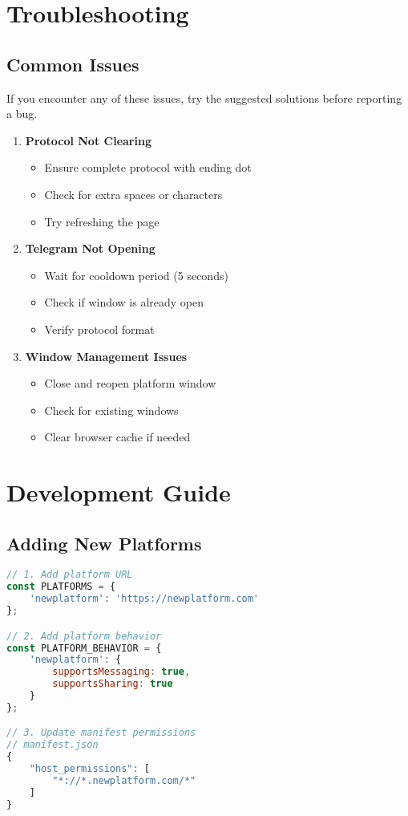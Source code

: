 \documentclass[12pt]{article}
\begin{document}
\section{Troubleshooting}
\subsection{Common Issues}
\begin{warningbox}
If you encounter any of these issues, try the suggested solutions before reporting a bug.
\end{warningbox}

\begin{enumerate}[leftmargin=*]
    \item \textbf{Protocol Not Clearing}
    \begin{itemize}
        \item Ensure complete protocol with ending dot
        \item Check for extra spaces or characters
        \item Try refreshing the page
    \end{itemize}
    
    \item \textbf{Telegram Not Opening}
    \begin{itemize}
        \item Wait for cooldown period (5 seconds)
        \item Check if window is already open
        \item Verify protocol format
    \end{itemize}
    
    \item \textbf{Window Management Issues}
    \begin{itemize}
        \item Close and reopen platform window
        \item Check for existing windows
        \item Clear browser cache if needed
    \end{itemize}
\end{enumerate}

\section{Development Guide}
\subsection{Adding New Platforms}
\begin{codebox}
\begin{lstlisting}[language=JavaScript]
// 1. Add platform URL
const PLATFORMS = {
    'newplatform': 'https://newplatform.com'
};

// 2. Add platform behavior
const PLATFORM_BEHAVIOR = {
    'newplatform': {
        supportsMessaging: true,
        supportsSharing: true
    }
};

// 3. Update manifest permissions
// manifest.json
{
    "host_permissions": [
        "*://*.newplatform.com/*"
    ]
}
\end{lstlisting}
\end{codebox}
\end{document}
